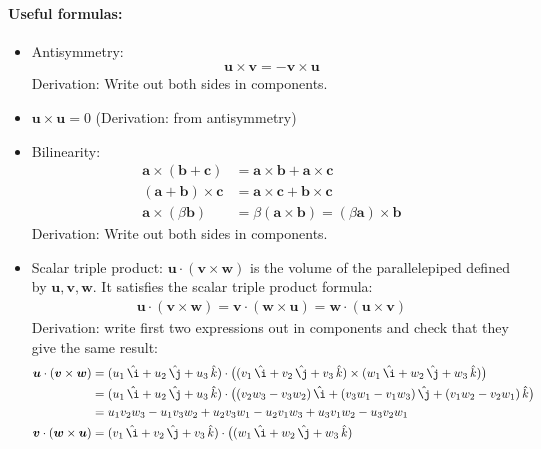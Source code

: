 \documentclass{article}
\renewcommand{\vec}[1]{\boldsymbol{#1}}
\newcommand{\unit}[1]{\,\hat{#1}}
\begin{document}
\paragraph{Useful formulas:}
\begin{itemize}
\item Antisymmetry:
  \begin{align}
    \vec{u} \times \vec{v} = - \vec{v} \times \vec{u}
  \end{align}
  Derivation: Write out both sides in components.
\item $\vec{u} \times \vec{u} = 0$ (Derivation: from antisymmetry)
\item Bilinearity:
  \begin{align}
    \vec{a} \times (\vec{b} + \vec{c})
    &= \vec{a} \times \vec{b} + \vec{a} \times \vec{c} \\
    (\vec{a} + \vec{b}) \times \vec{c}
    &= \vec{a} \times \vec{c} + \vec{b} \times \vec{c} \\
    \vec{a} \times (\beta \vec{b}) &= \beta (\vec{a} \times \vec{b}) = (\beta \vec{a}) \times \vec{b}
  \end{align}
  Derivation: Write out both sides in components.
\item Scalar triple product: $\vec{u} \cdot (\vec{v} \times \vec{w})$
  is the volume of the parallelepiped defined by $\vec{u}, \vec{v},
  \vec{w}$. It satisfies the scalar triple product formula:
  \begin{align}
    \vec{u} \cdot (\vec{v} \times \vec{w})
    = \vec{v} \cdot (\vec{w} \times \vec{u})
    = \vec{w} \cdot (\vec{u} \times \vec{v})
  \end{align}
  Derivation: write first two expressions out in components and check
  that they give the same result:
  \begin{align}
    \vec{u} \cdot (\vec{v} \times \vec{w})
    &= (u_1 \unit{\i} + u_2 \unit{\j} + u_3 \unit{k})
    \cdot \big( (v_1 \unit{\i} + v_2 \unit{\j} + v_3 \unit{k})
    \times (w_1 \unit{\i} + w_2 \unit{\j} + w_3 \unit{k}) \big) \\
    &= (u_1 \unit{\i} + u_2 \unit{\j} + u_3 \unit{k}) \cdot \big(
    (v_2 w_3 - v_3 w_2) \unit{\i}
    + (v_3 w_1 - v_1 w_3) \unit{\j}
    + (v_1 w_2 - v_2 w_1) \unit{k} \big) \\
    &= u_1 v_2 w_3 - u_1 v_3 w_2
    + u_2 v_3 w_1 - u_2 v_1 w_3
    + u_3 v_1 w_2 - u_3 v_2 w_1 \\
    \vec{v} \cdot (\vec{w} \times \vec{u})
    &= (v_1 \unit{\i} + v_2 \unit{\j} + v_3 \unit{k})
    \cdot \big( (w_1 \unit{\i} + w_2 \unit{\j} + w_3 \unit{k})

\end{align}
\end{itemize}
\end{document}
